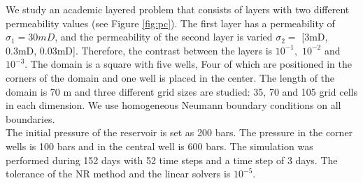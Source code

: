 \documentclass[12pt]{article}
\numberwithin{equation}{section}
\begin{document}
We study an academic layered problem that consists of layers with two different permeability values 
(see Figure \ref{fig:pc}). The first layer has a permeability of $\sigma_1 = 30mD$, and the permeability 
of the second layer is varied $\sigma_2 =$ [3mD, 0.3mD, 0.03mD]. Therefore, the contrast between the layers 
is $10^{-1},$ $10^{-2}$ and $10^{-3}$.
The domain is a square with five wells, Four of which are positioned in the corners of the domain and one 
well is placed in the center. The length of the domain is 70 m and three different grid sizes are studied: 
35, 70 and 105 grid cells in each dimension.  We use homogeneous Neumann boundary conditions on all boundaries. \\
The initial pressure of the reservoir is set as 200 bars. The pressure in the corner wells is 100 bars and 
in the central well is 600 bars.  
The simulation was performed during 152 days with 52 time steps and a time step of 3 days. The tolerance of 
the NR method and the linear solvers is $10^{-5}$.\\
\end{document}
